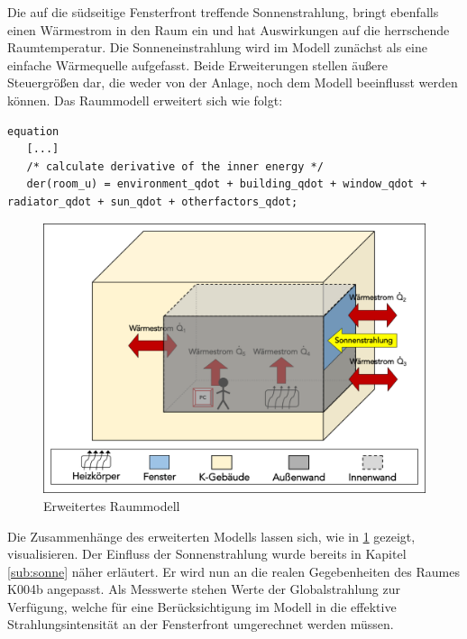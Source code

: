 Die auf die südseitige Fensterfront treffende Sonnenstrahlung, bringt ebenfalls einen Wärmestrom in den Raum ein und hat Auswirkungen auf die herrschende Raumtemperatur. Die Sonneneinstrahlung  wird im Modell zunächst als eine einfache Wärmequelle aufgefasst.
Beide Erweiterungen stellen äußere Steuergrößen dar, die weder von der Anlage, noch dem Modell beeinflusst werden können. Das Raummodell erweitert sich wie folgt:

\begin{lstlisting}[language=Modelica, caption={Erweitertes Gleichungssystem des Raummodells unter Berücksichtigung der Sonneneinstrahlung und weiterer Störgrößen},label=lst:raumdrei]
equation
   [...]
   /* calculate derivative of the inner energy */
   der(room_u) = environment_qdot + building_qdot + window_qdot + radiator_qdot + sun_qdot + otherfactors_qdot;
\end{lstlisting}

\begin{figure}
\centering
\includegraphics[width=\textwidth]{abbildungen/20160317_raumzwei}
\caption{Erweitertes Raummodell}
\label{fig:raumdrei}
\end{figure}


Die Zusammenhänge des erweiterten Modells lassen sich, wie in \ref{fig:raumdrei} gezeigt, visualisieren. Der Einfluss der Sonnenstrahlung wurde bereits in Kapitel \ref{sub:sonne} näher erläutert. Er wird nun an die realen Gegebenheiten des Raumes K004b angepasst. Als Messwerte stehen Werte der Globalstrahlung zur Verfügung, welche für eine Berücksichtigung im Modell in die effektive Strahlungsintensität an der Fensterfront umgerechnet werden müssen.

